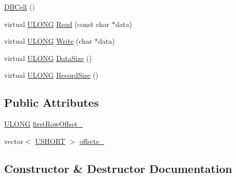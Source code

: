 \begin{DoxyCompactItemize}
\item 
\hyperlink{struct_y_excel_1_1_worksheet_1_1_cell_table_1_1_row_block_1_1_d_b_cell_a80b5983647428062f0cba6d18713cc56}{D\+B\+Cell} ()
\item 
virtual \hyperlink{_basic_excel_8hpp_abe09d1bea023be6a07cbadde8e955435}{U\+L\+O\+N\+G} \hyperlink{struct_y_excel_1_1_worksheet_1_1_cell_table_1_1_row_block_1_1_d_b_cell_afb0e53663a041c0b29a5287966f8720b}{Read} (const char $\ast$data)
\item 
virtual \hyperlink{_basic_excel_8hpp_abe09d1bea023be6a07cbadde8e955435}{U\+L\+O\+N\+G} \hyperlink{struct_y_excel_1_1_worksheet_1_1_cell_table_1_1_row_block_1_1_d_b_cell_a47416984ae766f49fe2a501b75edb696}{Write} (char $\ast$data)
\item 
virtual \hyperlink{_basic_excel_8hpp_abe09d1bea023be6a07cbadde8e955435}{U\+L\+O\+N\+G} \hyperlink{struct_y_excel_1_1_worksheet_1_1_cell_table_1_1_row_block_1_1_d_b_cell_a243516d2e4bbfaa2d4ebd5a0ae25d4c5}{Data\+Size} ()
\item 
virtual \hyperlink{_basic_excel_8hpp_abe09d1bea023be6a07cbadde8e955435}{U\+L\+O\+N\+G} \hyperlink{struct_y_excel_1_1_worksheet_1_1_cell_table_1_1_row_block_1_1_d_b_cell_ad9cb0ae5796b6ad9dc49e8275caf2fdf}{Record\+Size} ()
\end{DoxyCompactItemize}
\subsection*{Public Attributes}
\begin{DoxyCompactItemize}
\item 
\hyperlink{_basic_excel_8hpp_abe09d1bea023be6a07cbadde8e955435}{U\+L\+O\+N\+G} \hyperlink{struct_y_excel_1_1_worksheet_1_1_cell_table_1_1_row_block_1_1_d_b_cell_ac47e80b8012a4989e926b7bfcfdff4cb}{first\+Row\+Offset\+\_\+}
\item 
vector$<$ \hyperlink{_basic_excel_8hpp_a5850d5316caf7f4cedd742fdf8cd7c02}{U\+S\+H\+O\+R\+T} $>$ \hyperlink{struct_y_excel_1_1_worksheet_1_1_cell_table_1_1_row_block_1_1_d_b_cell_a4ff4295284571c1babeaa3e63fbf5eb9}{offsets\+\_\+}
\end{DoxyCompactItemize}


\subsection{Constructor \& Destructor Documentation}
\hypertarget{struct_y_excel_1_1_worksheet_1_1_cell_table_1_1_row_block_1_1_d_b_cell_a80b5983647428062f0cba6d18713cc56}{}
